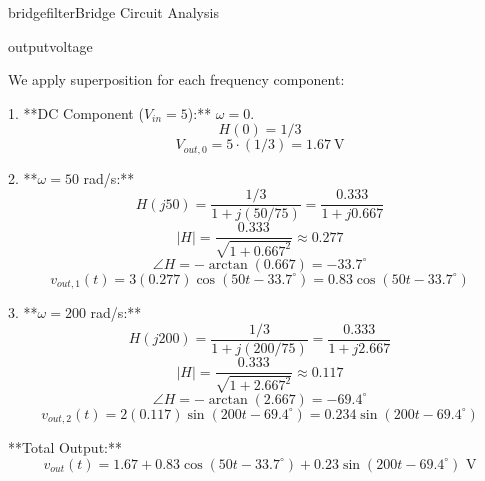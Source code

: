 \begin{mainquestion}{bridgefilter}{Bridge Circuit Analysis}
\begin{partquestion}{outputvoltage}
\begin{answer}[2in]
        We apply superposition for each frequency component:
        
        1. **DC Component ($V_{in} = 5$):** $\omega = 0$.
        \[H(0) = 1/3\]
        \[V_{out,0} = 5 \cdot (1/3) = 1.67~\text{V}\]

        2. **$\omega = 50$ rad/s:**
        \[H(j50) = \frac{1/3}{1 + j(50/75)} = \frac{0.333}{1 + j0.667}\]
        \[|H| = \frac{0.333}{\sqrt{1 + 0.667^2}} \approx 0.277\]
        \[\angle H = -\arctan(0.667) = -33.7^\circ\]
        \[v_{out,1}(t) = 3(0.277)\cos(50t - 33.7^\circ) = 0.83\cos(50t - 33.7^\circ)\]

        3. **$\omega = 200$ rad/s:**
        \[H(j200) = \frac{1/3}{1 + j(200/75)} = \frac{0.333}{1 + j2.667}\]
        \[|H| = \frac{0.333}{\sqrt{1 + 2.667^2}} \approx 0.117\]
        \[\angle H = -\arctan(2.667) = -69.4^\circ\]
        \[v_{out,2}(t) = 2(0.117)\sin(200t - 69.4^\circ) = 0.234\sin(200t - 69.4^\circ)\]

        **Total Output:**
        \[v_{out}(t) = 1.67 + 0.83\cos(50t - 33.7^\circ) + 0.23\sin(200t - 69.4^\circ) \text{ V}\]
\end{answer}

\end{partquestion}

\end{mainquestion}
